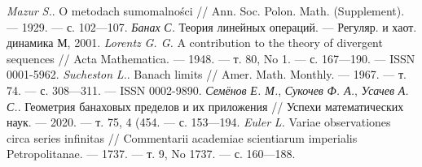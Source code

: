 \documentclass[a4paper,openbib]{article}
\theoremstyle{definition}
\begin{document}
\begin{thebibliography}{99}
%
\emph{Mazur} \emph{S.}. O metodach sumomalności // Ann. Soc. Polon. Math. (Supplement). — 1929. —
с. 102—107.
%
\emph{Банах} \emph{С.} Теория линейных операций. — Регуляр. и хаот. динамика М, 2001.
%
\emph{Lorentz} \emph{G. G.} A contribution to the theory of divergent sequences // Acta Mathematica. —
1948. — т. 80, No 1. — с. 167—190. — ISSN 0001-5962.%
\emph{Sucheston} \emph{L.}. Banach limits // Amer. Math. Monthly. — 1967. — т. 74. — с. 308—311. —
ISSN 0002-9890.
%
\emph{Семёнов} \emph{Е. М.}, \emph{Сукочев} \emph{Ф. А.}, \emph{Усачев} \emph{А. С.}.
Геометрия банаховых пределов и их приложения // Успехи математических наук. — 2020. — т. 75, 4
(454. — с. 153—194.
%
\emph{Euler} \emph{L.} Variae observationes circa series infinitas // Commentarii academiae scientiarum
imperialis Petropolitanae. — 1737. — т. 9, No 1737. — с. 160—188.
\end{thebibliography}
\end{document}
